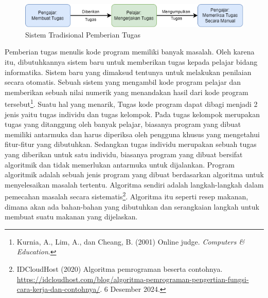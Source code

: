 \documentclass[a4paper,twoside]{article}
\begin{document}
\vspace{0.25cm}

\begin{figure}[H]
	\centering
	\includegraphics[width=\textwidth]{tradisional.drawio.png}
	\caption[Sistem Tradisional Pemberian Tugas]{Sistem Tradisional Pemberian Tugas}
	\label{fig:1:tradisional}
\end{figure}

\newpage

Pemberian tugas menulis kode program memiliki banyak masalah. Oleh karena itu, dibutuhkannya sistem baru untuk memberikan tugas kepada pelajar bidang informatika. Sistem baru yang dimaksud tentunya untuk melakukan penilaian secara otomatis. Sebuah sistem yang mengambil kode program pelajar dan memberikan sebuah nilai numerik yang menandakan hasil dari kode program tersebut\footnote{Kurnia, A., Lim, A., dan Cheang, B. (2001) Online judge. {\em Computers \& Education}.}. Suatu hal yang menarik, Tugas kode program dapat dibagi menjadi 2 jenis yaitu tugas individu dan tugas kelompok. Pada tugas kelompok merupakan tugas yang ditanggung oleh banyak pelajar, biasanya program yang dibuat memiliki antarmuka dan harus diperiksa oleh pengguna khusus yang mengetahui fitur-fitur yang dibutuhkan. Sedangkan tugas individu merupakan sebuah tugas yang diberikan untuk satu individu, biasanya program yang dibuat bersifat algoritmik dan tidak memerlukan antarmuka untuk dijalankan. Program algoritmik adalah sebuah jenis program yang dibuat berdasarkan algoritma untuk menyelesaikan masalah tertentu. Algoritma sendiri adalah langkah-langkah dalam pemecahan masalah secara sistematis\footnote{IDCloudHost (2020) Algoritma pemrograman beserta contohnya.
	\newblock \url{https://idcloudhost.com/blog/algoritma-pemrograman-pengertian-fungsi-cara-kerja-dan-contohnya/}.
	6 Desember 2024.}.
Algoritma itu seperti resep makanan, dimana akan ada bahan-bahan yang dibutuhkan dan serangkaian langkah untuk membuat suatu makanan yang dijelaskan.
\end{document}
